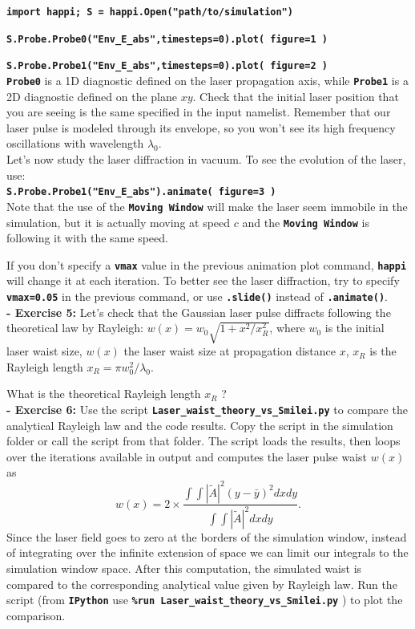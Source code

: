 \documentclass[a4paper,12pt]{extarticle}
\newcommand{\commandline}[1]{\texttt{\textbf{#1}}}
\begin{document}
\commandline{import happi; S =  happi.Open("path/to/simulation")}

\commandline{S.Probe.Probe0("Env\_E\_abs",timesteps=0).plot( figure=1 )}

\commandline{S.Probe.Probe1("Env\_E\_abs",timesteps=0).plot( figure=2 )}\\

\commandline{Probe0} is a 1D diagnostic defined on the laser propagation axis, while \commandline{Probe1} is a 2D diagnostic defined on the plane $xy$. Check that the initial laser position that you are seeing is the same specified in the input namelist. Remember that our laser pulse is modeled through its envelope, so you won't see its high frequency oscillations with wavelength $\lambda_0$.\\

Let's now study the laser diffraction in vacuum. To see the evolution of the laser, use:\\ 

\commandline{S.Probe.Probe1("Env\_E\_abs").animate( figure=3 )}\\

Note that the use of the \commandline{Moving Window} will make the laser seem immobile in the simulation, but it is actually moving at speed $c$ and the \commandline{Moving Window} is following it with the same speed.

If you don't specify a \commandline{vmax} value in the previous animation plot command, \commandline{happi} will change it at each iteration. To better see the laser diffraction, try to  specify \commandline{vmax=0.05} in the previous command, or use \commandline{.slide()} instead of \commandline{.animate()}.\\

\textbf{ - Exercise  5:} Let's check that the Gaussian laser pulse diffracts following the theoretical law by Rayleigh: $w(x)=w_0\sqrt{1+x^2/x_R^2}$, where $w_0$ is the initial laser waist size, $w(x)$ the laser waist size at propagation distance $x$, $x_R$ is the Rayleigh length $x_R=\pi w_0^2/\lambda_0$. 

What is the theoretical Rayleigh length $x_R$ ?\\

\textbf{ - Exercise  6:} Use the script \commandline{Laser\_waist\_theory\_vs\_Smilei.py} to compare the analytical Rayleigh law and the code results. Copy the script in the simulation folder or call the script from that folder. The script loads the results, then loops over the iterations available in output and computes the laser pulse waist $w(x)$ as 
\begin{equation}
w(x)=2\times\frac{\int\int|\tilde{A}|^2  (y-\bar{y})^2 dx dy}{\int\int |\tilde{A}|^2  dx dy}.
\end{equation} Since the laser field goes to zero at the borders of the simulation window, instead of integrating over the infinite extension of space we can limit our integrals to the simulation window space. After this computation, the simulated waist is compared to the corresponding analytical value given by Rayleigh law. Run the script (from \commandline{IPython} use \commandline{\%run Laser\_waist\_theory\_vs\_Smilei.py} ) to plot the comparison.
\end{document}
